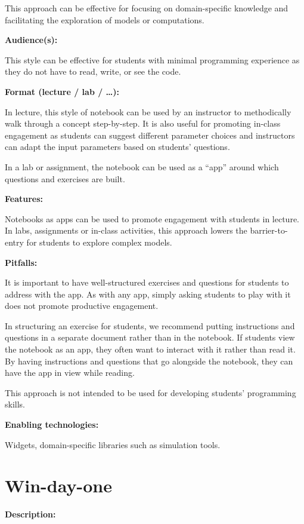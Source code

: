 \documentclass[]{book}
\begin{document}
This approach can be effective for focusing on domain-specific knowledge
and facilitating the exploration of models or computations.

\textbf{Audience(s):}

This style can be effective for students with minimal programming
experience as they do not have to read, write, or see the code.

\textbf{Format (lecture / lab / \ldots{}):}

In lecture, this style of notebook can be used by an instructor to
methodically walk through a concept step-by-step. It is also useful for
promoting in-class engagement as students can suggest different
parameter choices and instructors can adapt the input parameters based
on students' questions.

In a lab or assignment, the notebook can be used as a ``app'' around
which questions and exercises are built.

\textbf{Features:}

Notebooks as apps can be used to promote engagement with students in
lecture. In labs, assignments or in-class activities, this approach
lowers the barrier-to-entry for students to explore complex models.

\textbf{Pitfalls:}

It is important to have well-structured exercises and questions for
students to address with the app. As with any app, simply asking
students to play with it does not promote productive engagement.

In structuring an exercise for students, we recommend putting
instructions and questions in a separate document rather than in the
notebook. If students view the notebook as an app, they often want to
interact with it rather than read it. By having instructions and
questions that go alongside the notebook, they can have the app in view
while reading.

This approach is not intended to be used for developing students'
programming skills.

\textbf{Enabling technologies:}

Widgets, domain-specific libraries such as simulation tools.

\hypertarget{win-day-one}{\section{Win-day-one}\label{win-day-one}}

\textbf{Description:}
\end{document}

